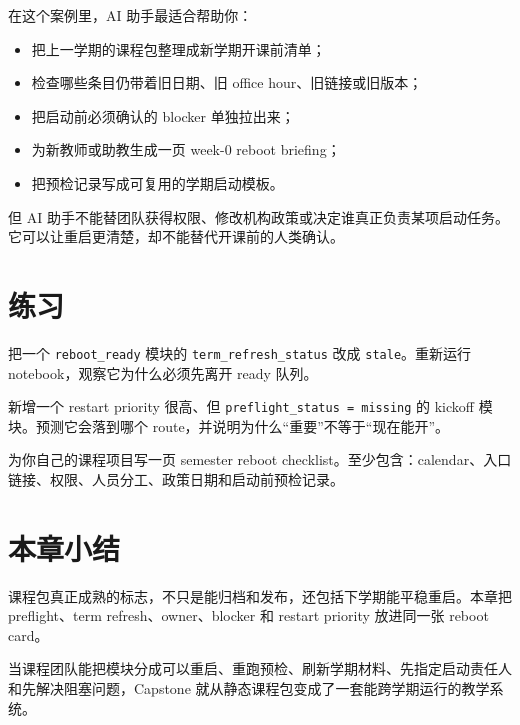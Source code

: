 在这个案例里，AI 助手最适合帮助你：

\begin{itemize}
    \item 把上一学期的课程包整理成新学期开课前清单；
    \item 检查哪些条目仍带着旧日期、旧 office hour、旧链接或旧版本；
    \item 把启动前必须确认的 blocker 单独拉出来；
    \item 为新教师或助教生成一页 week-0 reboot briefing；
    \item 把预检记录写成可复用的学期启动模板。
\end{itemize}

但 AI 助手不能替团队获得权限、修改机构政策或决定谁真正负责某项启动任务。它可以让重启更清楚，却不能替代开课前的人类确认。

\section{练习}

\begin{exercisebox}[基础练习]
把一个 \texttt{reboot\_ready} 模块的 \texttt{term\_refresh\_status} 改成 \texttt{stale}。重新运行 notebook，观察它为什么必须先离开 ready 队列。
\end{exercisebox}

\begin{exercisebox}[进阶练习]
新增一个 restart priority 很高、但 \texttt{preflight\_status = missing} 的 kickoff 模块。预测它会落到哪个 route，并说明为什么“重要”不等于“现在能开”。
\end{exercisebox}

\begin{exercisebox}[开放练习]
为你自己的课程项目写一页 semester reboot checklist。至少包含：calendar、入口链接、权限、人员分工、政策日期和启动前预检记录。
\end{exercisebox}

\section{本章小结}

课程包真正成熟的标志，不只是能归档和发布，还包括下学期能平稳重启。本章把 preflight、term refresh、owner、blocker 和 restart priority 放进同一张 reboot card。

当课程团队能把模块分成可以重启、重跑预检、刷新学期材料、先指定启动责任人和先解决阻塞问题，Capstone 就从静态课程包变成了一套能跨学期运行的教学系统。
